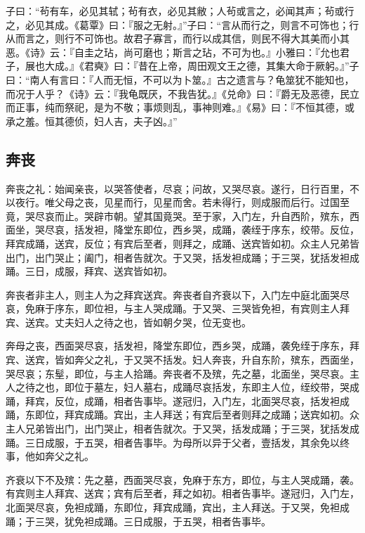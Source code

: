 \documentclass[]{article}
\begin{document}
子曰：``茍有车，必见其轼；茍有衣，必见其敝；人茍或言之，必闻其声；茍或行之，必见其成。《葛覃》曰：『服之无射。』''子曰：``言从而行之，则言不可饰也；行从而言之，则行不可饰也。故君子寡言，而行以成其信，则民不得大其美而小其恶。《诗》云：『自圭之玷，尚可磨也；斯言之玷，不可为也。』小雅曰：『允也君子，展也大成。』《君奭》曰：『昔在上帝，周田观文王之德，其集大命于厥躬。』''子曰：``南人有言曰：『人而无恒，不可以为卜筮。』古之遗言与？龟筮犹不能知也，而况于人乎？《诗》云：『我龟既厌，不我告犹。』《兑命》曰：『爵无及恶德，民立而正事，纯而祭祀，是为不敬；事烦则乱，事神则难。』《易》曰：『不恒其德，或承之羞。恒其德侦，妇人吉，夫子凶。』''

\hypertarget{header-n771}{%
\subsection{奔丧}\label{header-n771}}

奔丧之礼：始闻亲丧，以哭答使者，尽哀；问故，又哭尽哀。遂行，日行百里，不以夜行。唯父母之丧，见星而行，见星而舍。若未得行，则成服而后行。过国至竟，哭尽哀而止。哭辟市朝。望其国竟哭。至于家，入门左，升自西阶，殡东，西面坐，哭尽哀，括发袒，降堂东即位，西乡哭，成踊，袭绖于序东，绞带。反位，拜宾成踊，送宾，反位；有宾后至者，则拜之，成踊、送宾皆如初。众主人兄弟皆出门，出门哭止；阖门，相者告就次。于又哭，括发袒成踊；于三哭，犹括发袒成踊。三日，成服，拜宾、送宾皆如初。

奔丧者非主人，则主人为之拜宾送宾。奔丧者自齐衰以下，入门左中庭北面哭尽哀，免麻于序东，即位袒，与主人哭成踊。于又哭、三哭皆免袒，有宾则主人拜宾、送宾。丈夫妇人之待之也，皆如朝夕哭，位无变也。

奔母之丧，西面哭尽哀，括发袒，降堂东即位，西乡哭，成踊，袭免绖于序东，拜宾、送宾，皆如奔父之礼，于又哭不括发。妇人奔丧，升自东阶，殡东，西面坐，哭尽哀；东髽，即位，与主人拾踊。奔丧者不及殡，先之墓，北面坐，哭尽哀。主人之待之也，即位于墓左，妇人墓右，成踊尽哀括发，东即主人位，绖绞带，哭成踊，拜宾，反位，成踊，相者告事毕。遂冠归，入门左，北面哭尽哀，括发袒成踊，东即位，拜宾成踊。宾出，主人拜送；有宾后至者则拜之成踊；送宾如初。众主人兄弟皆出门，出门哭止，相者告就次。于又哭，括发成踊；于三哭，犹括发成踊。三日成服，于五哭，相者告事毕。为母所以异于父者，壹括发，其余免以终事，他如奔父之礼。

齐衰以下不及殡：先之墓，西面哭尽哀，免麻于东方，即位，与主人哭成踊，袭。有宾则主人拜宾、送宾；宾有后至者，拜之如初。相者告事毕。遂冠归，入门左，北面哭尽哀，免袒成踊，东即位，拜宾成踊，宾出，主人拜送。于又哭，免袒成踊；于三哭，犹免袒成踊。三日成服，于五哭，相者告事毕。
\end{document}
